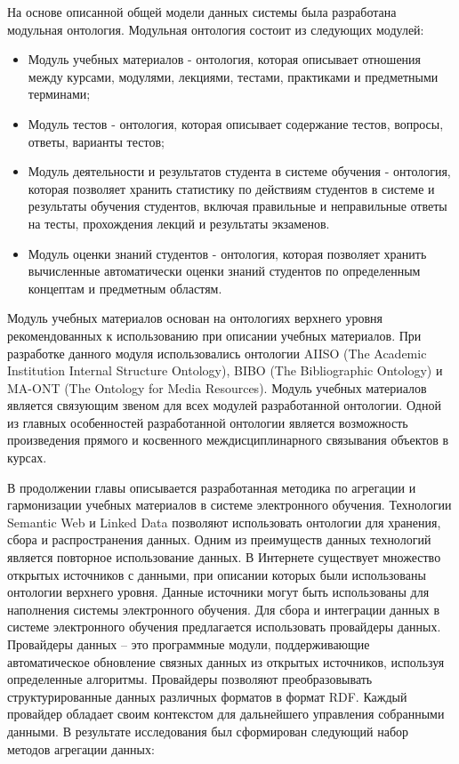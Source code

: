 На основе описанной общей модели данных системы была разработана модульная онтология. Модульная онтология состоит из следующих модулей:


\begin{itemize}
\item Модуль учебных материалов - онтология, которая описывает отношения между курсами, модулями, лекциями, тестами, практиками и предметными терминами;
\item Модуль тестов - онтология, которая описывает содержание тестов, вопросы, ответы, варианты тестов;
\item Модуль деятельности и результатов студента в системе обучения - онтология, которая позволяет хранить статистику по действиям студентов в системе и результаты обучения студентов, включая правильные и неправильные ответы на тесты, прохождения лекций и результаты экзаменов.
\item Модуль оценки знаний студентов - онтология, которая позволяет хранить вычисленные автоматически оценки знаний студентов по определенным концептам и предметным областям.
\end{itemize}

Модуль учебных материалов основан на онтологиях верхнего уровня рекомендованных к использованию при описании учебных материалов. При разработке данного модуля использовались онтологии AIISO (The Academic Institution Internal Structure Ontology), BIBO (The Bibliographic Ontology) и MA-ONT (The Ontology for Media Resources). Модуль учебных материалов является связующим звеном для всех модулей разработанной онтологии. Одной из главных особенностей разработанной онтологии является возможность произведения прямого и косвенного междисциплинарного связывания объектов в курсах.   


В продолжении главы описывается разработанная методика по агрегации и гармонизации учебных материалов в системе электронного обучения. Технологии Semantic Web и Linked Data позволяют использовать онтологии для хранения, сбора и распространения данных. Одним из преимуществ данных технологий является повторное использование данных. В Интернете существует множество открытых источников с данными, при описании которых были использованы онтологии верхнего уровня. Данные источники могут быть использованы для наполнения системы электронного обучения. Для сбора и интеграции данных в системе электронного обучения предлагается использовать провайдеры данных. Провайдеры данных -- это программные модули, поддерживающие автоматическое обновление связных данных из открытых источников, используя определенные алгоритмы. Провайдеры позволяют преобразовывать структурированные данных различных форматов в формат RDF. Каждый провайдер обладает своим контекстом для дальнейшего управления собранными данными. В результате исследования был сформирован следующий набор методов агрегации данных:


